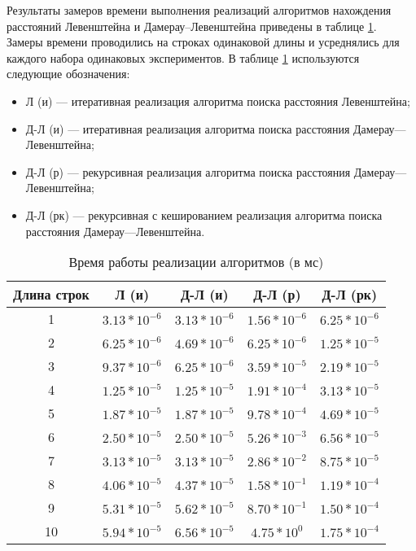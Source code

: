 Результаты замеров времени выполнения реализаций алгоритмов нахождения расстояний
Левенштейна и Дамерау–Левенштейна приведены в таблице \ref{tbl:time_measurements}. Замеры времени проводились на строках одинаковой длины и усреднялись для каждого набора одинаковых экспериментов. В таблице \ref{tbl:time_measurements} используются следующие обозначения: 
\begin{itemize}
	\item Л (и) --- итеративная реализация алгоритма поиска расстояния Левенштейна;
	\item Д-Л (и) --- итеративная реализация алгоритма поиска расстояния Дамерау---Левенштейна;
	\item Д-Л (р) --- рекурсивная реализация алгоритма поиска расстояния Дамерау---Левенштейна;
	\item Д-Л (рк) --- рекурсивная с кешированием реализация алгоритма поиска расстояния Дамерау---Левенштейна.
\end{itemize}

\begin{table}[h]
	\begin{center}
		\begin{threeparttable}
			\captionsetup{justification=raggedright,singlelinecheck=off}
			\caption{Время работы реализации алгоритмов (в мс)}
			\label{tbl:time_measurements}
			\begin{tabular}{|c|c|c|c|c|}
				\hline
				Длина строк &  Л (и)  & Д-Л (и) & Д-Л (р) & Д-Л (рк) \\
				\hline
				1 &$ 3.13* 10^{-6} $&$ 3.13* 10^{-6} $&$ 1.56* 10^{-6} $&$ 6.25* 10^{-6}$\\
				\hline
				2 &$ 6.25* 10^{-6} $&$ 4.69* 10^{-6} $&$ 6.25* 10^{-6} $&$ 1.25* 10^{-5}$\\
				\hline
				3 &$ 9.37* 10^{-6} $&$ 6.25* 10^{-6} $&$ 3.59* 10^{-5} $&$ 2.19* 10^{-5}$\\
				\hline
				4 &$ 1.25* 10^{-5} $&$ 1.25* 10^{-5} $&$ 1.91* 10^{-4} $&$ 3.13* 10^{-5}$\\
				\hline
				5 &$ 1.87* 10^{-5} $&$ 1.87* 10^{-5} $&$ 9.78* 10^{-4} $&$ 4.69* 10^{-5}$\\
				\hline
				6 &$ 2.50* 10^{-5} $&$ 2.50* 10^{-5} $&$ 5.26* 10^{-3} $&$ 6.56* 10^{-5}$\\
				\hline
				7 &$ 3.13* 10^{-5} $&$ 3.13* 10^{-5} $&$ 2.86* 10^{-2} $&$ 8.75* 10^{-5}$\\
				\hline
				8 &$ 4.06* 10^{-5} $&$ 4.37* 10^{-5} $&$ 1.58* 10^{-1} $&$ 1.19* 10^{-4}$\\
				\hline
				9 &$ 5.31* 10^{-5} $&$ 5.62* 10^{-5} $&$ 8.70* 10^{-1} $&$ 1.50* 10^{-4}$\\
				\hline
				10 &$ 5.94* 10^{-5} $&$ 6.56* 10^{-5} $&$ 4.75* 10^{0} $&$ 1.75* 10^{-4}$\\
				\hline
				
				
			\end{tabular}
		\end{threeparttable}
	\end{center}
\end{table}

